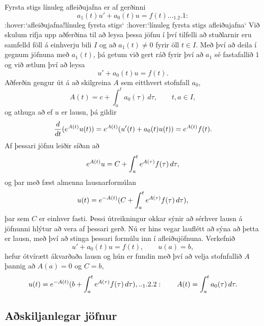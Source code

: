 Fyrsta stigs línuleg afleiðujafna er af gerðinni
 \begin{equation*}a_1(t)u'+a_0(t)u=f(t).

.. _1.2.1:

 \end{equation*} :hover:`afleiðujafna!línuleg fyrsta stigs`
 :hover:`línuleg fyrsta stigs afleiðujafna`
Við skulum rifja upp aðferðina til að leysa þessa jöfnu í  því tilfelli
að stuðlarnir eru samfelld föll á einhverju bili $I$ og að $a_1(t)\neq
0$ fyrir öll $t\in I$. Með því að deila í gegnum jöfnuna með $a_1(t)$,
þá getum við gert ráð fyrir því að $a_1$ sé fastafallið $1$ og við ætlum
því að leysa
 $$u'+a_0(t)u=f(t).
 $$
Aðferðin gengur út á
að skilgreina $A$ sem eitthvert stofnfall $a_0$,
 $$A(t)=c+\int_a^t a_0({\tau})\, d{\tau}, \qquad t,a\in I, 
 $$ 
og athuga að ef $u$ er lausn, þá gildir
 $$\dfrac d{dt} (e\sp{A(t)}u(t))=e\sp{A(t)}(u'(t)+a_0(t)u(t))=e\sp{A(t)}f(t).
 $$
Af þessari jöfnu leiðir síðan að 
 $$e\sp{A(t)}u=C+\int_a^t e\sp{A({\tau})}f({\tau}) \, d{\tau},
 $$
og þar með fæst almenna lausnarformúlan
 $$u(t)=e\sp{-A(t)}(C+\int_a^t e\sp{A({\tau})}f({\tau}) \, d{\tau}),
 $$
þar sem $C$ er einhver fasti.  Þessi útreikningur okkar sýnir að
sérhver lausn á jöfnunni hlýtur að vera af þessari gerð. Nú er hins
vegar lauflétt að sýna að þetta er lausn, með því að stinga þessari 
formúlu inn í
afleiðujöfnuna.  Verkefnið 
 $$u'+a_0(t)u=f(t), \qquad u(a)=b,
 $$
hefur ótvírætt ákvarðaða lausn og hún er fundin  með því að velja
stofnfallið $A$ þannig að $A(a)=0$ og $C=b$,
 \begin{equation*}
u(t)=e\sp{-A(t)}(b+\int_a\sp t e\sp{A(\tau)}f(\tau) \, d\tau), 

.. _1.2.2:

\qquad A(t)=\int_a\sp t a_0(\tau) \, d\tau.
 \end{equation*}

\subsection*{Aðskiljanlegar jöfnur}

